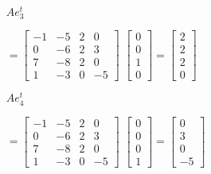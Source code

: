 \begin{enumerate}
\begin{description}
\begin{enumerate} \item [$Ae_{3}^{t}$]

$=\left[ \begin{array}{rrrr}
                       -1&-5&2&0\\
                       0&-6&2&3\\
                       7&-8&2&0\\
                       1&-3&0&-5 \end{array} \right]$
$  \left [\begin{array}{r}
                         0\\
                         0\\
                         1\\
                         0 \end{array} \right] = \left [\begin{array}{r}
                        2\\
                        2\\
                        2\\
                        0\end{array} \right]$
\end{enumerate}

\begin{enumerate} \item [$Ae_{4}^{t}$]

$=\left[ \begin{array}{rrrr}
                       -1&-5&2&0\\
                       0&-6&2&3\\
                       7&-8&2&0\\
                       1&-3&0&-5 \end{array} \right]$
$  \left [\begin{array}{r}
                         0\\
                         0\\
                         0\\
                         1\end{array} \right] = \left [\begin{array}{r}
                        0\\
                        3\\
                        0\\
                        -5 \end{array} \right]$
\end{enumerate}


\end{description}
\end{enumerate}
